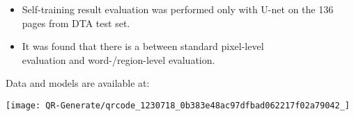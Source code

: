 {\begin{itemize}
  \itemsep=-.0em
  \small 
  \setlength{\leftskip}{-1.5em}
  
\item Self-training result evaluation was performed only with U-net on the 136\\
pages from DTA test set.
\item It was found that there is a  between
  standard pixel-level\\evaluation and word-/region-level evaluation.
\end{itemize}

\begin{flushright}
  \vspace{-5em}
  \begin{minipage}[b]{.125\linewidth}
    Data and models are available at:
    \vspace{-0.7em}
  \end{minipage}\hspace{.5em}%
  \texttt{[image: QR-Generate/qrcode\_1230718\_0b383e48ac97dfbad062217f02a79042\_]}%
\end{flushright}
}


